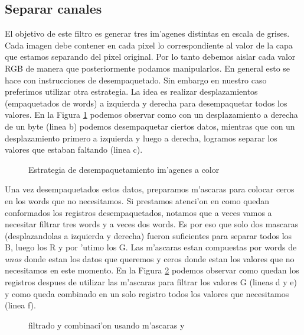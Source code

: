\subsection{Separar canales}
El objetivo de este filtro es generar tres im'agenes distintas en escala de grises. Cada imagen debe contener en cada pixel lo correspondiente al valor de la capa que estamos separando del pixel original. Por lo tanto debemos aislar cada valor RGB de manera que posteriormente podamos manipularlos. En general esto se hace con instrucciones de desempaquetado. Sin embargo en nuestro caso preferimos utilizar otra estrategia. La idea es realizar desplazamientos (empaquetados de words) a izquierda y derecha para desempaquetar todos los valores. En la Figura \ref{est:separar-1} podemos observar como con un desplazamiento a derecha de un byte (linea b) podemos desempaquetar ciertos datos, mientras que con un desplazamiento primero a izquierda y luego a derecha, logramos separar los valores que estaban faltando (linea c).

\begin{figure}[ht]
\caption{Estrategia de desempaquetamiento im'agenes a color}
\label{est:separar-1}
\end{figure}

Una vez desempaquetados estos datos, preparamos m'ascaras para colocar ceros en los words que no necesitamos. Si prestamos atenci'on en como quedan conformados los registros desempaquetados, notamos que a veces vamos a necesitar filtrar tres words y a veces dos words. Es por eso que solo dos mascaras (desplazandolas a izquierda y derecha) fueron suficientes para separar todos los B, luego los R y por 'utimo los G. Las m'ascaras estan compuestas por words de \textit{unos} donde estan los datos que queremos y ceros donde estan los valores que no necesitamos en este momento. En la Figura \ref{est:separar-2} podemos observar como quedan los registros despues de utilizar las m'ascaras para filtrar los valores G (lineas d y e) y como queda combinado en un solo registro todos los valores que necesitamos (linea f).

\begin{figure}[ht]
\caption{filtrado y combinaci'on usando m'ascaras  y }
\label{est:separar-2}
\end{figure}

